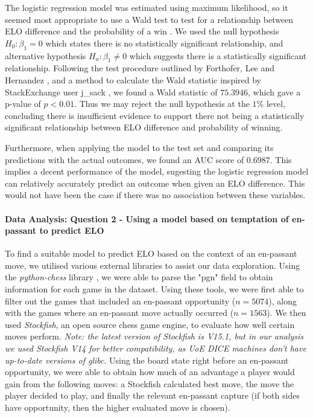 \documentclass[10pt,a4paper,twocolumn]{article}
\begin{document}
The logistic regression model was estimated using maximum likelihood, so it seemed most appropriate to use a Wald test to test for a relationship between ELO difference and the probability of a win \cite{WaldTest}. We used the null hypothesis $H_{0}: \beta_{1} = 0$ which states there is no statistically significant relationship, and alternative hypothesis $H_{a}: \beta_{1} \neq 0$ which suggests there is a statistically significant relationship. Following the test procedure outlined by Forthofer, Lee and Hernandez \cite{WaldTest}, and a method to calculate the Wald statistic inspired by StackExchange user j\_sack \cite{StackExchangeWaldTest}, we found a Wald statistic of $75.3946$, which gave a p-value of $p<0.01$. Thus we may reject the null hypothesis at the $1\%$ level, concluding there is insufficient evidence to support there not being a statistically significant relationship between ELO difference and probability of winning. \newline

Furthermore, when applying the model to the test set and comparing its predictions with the actual outcomes, we found an AUC score of $0.6987$. This implies a decent performance of the model, sugesting the logistic regression model can relatively accurately predict an outcome when given an ELO difference. This would not have been the case if there was no association between these variables. \newline




\paragraph{Data Analysis: Question 2 - Using a model based on temptation of en-passant to predict ELO}
To find a suitable model to predict ELO based on the context of an en-passant move, we utilised various external libraries to assist our data exploration. Using the \textit{python-chess} library \cite{python-chess}, we were able to parse the "pgn" field to obtain information for each game in the dataset. Using these tools, we were first able to filter out the games that included an en-passant opportunity ($n=5074$), along with the games where an en-passant move actually occurred ($n=1563$). We then used \textit{Stockfish}\cite{StockFish}, an open source chess game engine, to evaluate how well certain moves perform. \textit{Note: the latest version of Stockfish is V15.1, but in our analysis we used Stockfish V14 for better compatibility, as UoE DICE machines don't have up-to-date versions of glibc}. Using the board state right before an en-passant opportunity, we were able to obtain how much of an advantage a player would gain from the following moves: a Stockfish calculated best move, the move the player decided to play, and finally the relevant en-passant capture (if both sides have opportunity, then the higher evaluated move is chosen).\newline
\end{document}

